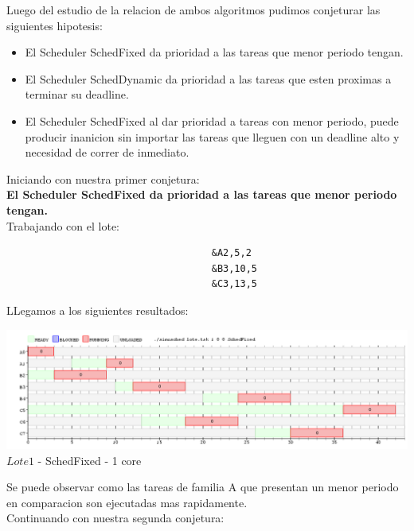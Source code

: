 \indent Luego del estudio de la relacion de ambos algoritmos pudimos conjeturar las siguientes hipotesis:\\

\begin{itemize}
\item El Scheduler SchedFixed da prioridad a las tareas que menor periodo tengan.
\item El Scheduler SchedDynamic da prioridad a las tareas que esten proximas a terminar su deadline.
 \item El Scheduler SchedFixed al dar prioridad a tareas con menor periodo, puede producir inanicion sin importar las
 tareas que lleguen con un deadline alto y necesidad de correr de inmediato.
\end{itemize}

Iniciando con nuestra primer conjetura:\\

\textbf{El Scheduler SchedFixed da prioridad a las tareas que menor periodo tengan.}\\

Trabajando con el lote:\\

\begin{verbatim}
                                    &A2,5,2
                                    &B3,10,5
                                    &C3,13,5
\end{verbatim}

LLegamos a los siguientes resultados:\\

\begin{center}
    	\includegraphics[width=450pt]{fixedej8a.png}
	{$Lote 1$ - SchedFixed - 1 core }	
 \end{center}

Se puede observar como las tareas de familia A que presentan un menor periodo en comparacion son ejecutadas mas rapidamente.\\

Continuando con nuestra segunda conjetura:\\

